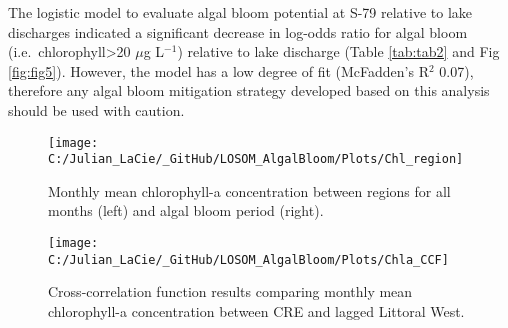 \documentclass[]{interact}
\theoremstyle{plain}%
\theoremstyle{definition}
\theoremstyle{remark}
\begin{document}
The logistic model to evaluate algal bloom potential at S-79 relative to
lake discharges indicated a significant decrease in log-odds ratio for
algal bloom (i.e.~chlorophyll\textgreater20 \(\mu\)g L\(^{-1}\))
relative to lake discharge (Table \ref{tab:tab2} and Fig
\ref{fig:fig5}). However, the model has a low degree of fit (McFadden's
R\(^{2}\) 0.07), therefore any algal bloom mitigation strategy developed
based on this analysis should be used with caution.

\begin{figure}[H]
\texttt{[image: C:/Julian\_LaCie/\_GitHub/LOSOM\_AlgalBloom/Plots/Chl\_region]} \caption{\label{fig:fig3} Monthly mean chlorophyll-a concentration between regions for all months (left) and algal bloom period (right).}\label{fig:unnamed-chunk-5}
\end{figure}

\begin{figure}[H]

{\centering \texttt{[image: C:/Julian\_LaCie/\_GitHub/LOSOM\_AlgalBloom/Plots/Chla\_CCF]} 

}

\caption{\label{fig:fig4}Cross-correlation function results comparing monthly mean chlorophyll-a concentration between CRE and lagged Littoral West. }\label{fig:unnamed-chunk-6}
\end{figure}

\providecommand{\docline}[3]{\noalign{\global\setlength{\arrayrulewidth}{#1}}\arrayrulecolor[HTML]{#2}\cline{#3}}

\setlength{\tabcolsep}{2pt}

\renewcommand*{\arraystretch}{1.5}
\end{document}
